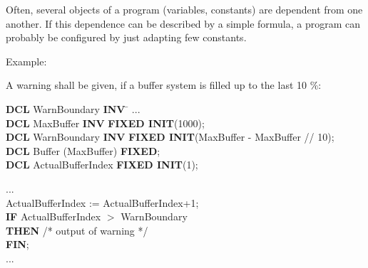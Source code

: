 Often, several objects of a program (variables, constants) are dependent
from one another. If this dependence can be described by a simple
formula, a program can probably be configured by just adapting few
constants.

Example:

A warning shall be given, if a buffer system is filled up to the last 10
\%:

\begin{tabbing}
{\bf DCL} WarnBoundary \= {\bf INV} \= \kill
... \> \> \\
{\bf DCL} MaxBuffer    \> {\bf INV} \> {\bf FIXED INIT}(1000); \\
{\bf DCL} WarnBoundary \> {\bf INV} \> {\bf FIXED INIT}(MaxBuffer - MaxBuffer // 10);\\
{\bf DCL} Buffer (MaxBuffer) \>     \> {\bf FIXED};\\
{\bf DCL} ActualBufferIndex \>     \> {\bf FIXED INIT}(1);
\end{tabbing}
... \\
ActualBufferIndex := ActualBufferIndex+1;\\
{\bf IF} ActualBufferIndex $>$ WarnBoundary\\
{\bf THEN} /* output of warning */ \\
{\bf FIN};\\
...
